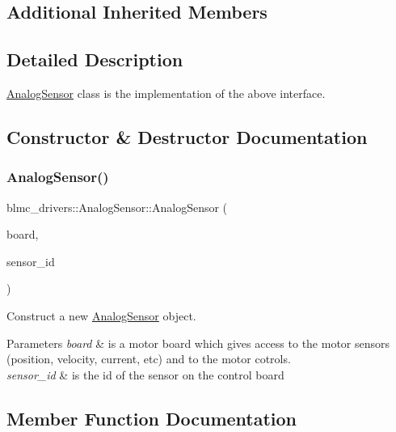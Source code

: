 \subsection*{Additional Inherited Members}


\subsection{Detailed Description}
\hyperlink{classblmc__drivers_1_1AnalogSensor}{Analog\+Sensor} class is the implementation of the above interface. 

\subsection{Constructor \& Destructor Documentation}
\mbox{\label{classblmc__drivers_1_1AnalogSensor_a3107ba6bba78d46e126ffc74c88f5a69}} 
\subsubsection{\texorpdfstring{Analog\+Sensor()}{AnalogSensor()}}
{\footnotesize\ttfamily blmc\+\_\+drivers\+::\+Analog\+Sensor\+::\+Analog\+Sensor (\begin{DoxyParamCaption}\item[{std\+::shared\+\_\+ptr$<$ \hyperlink{classblmc__drivers_1_1MotorBoardInterface}{Motor\+Board\+Interface} $>$}]{board,  }\item[{bool}]{sensor\+\_\+id }\end{DoxyParamCaption})}



Construct a new \hyperlink{classblmc__drivers_1_1AnalogSensor}{Analog\+Sensor} object. 


\begin{DoxyParams}{Parameters}
{\em board} & is a motor board which gives access to the motor sensors (position, velocity, current, etc) and to the motor cotrols. \\
\hline
{\em sensor\+\_\+id} & is the id of the sensor on the control board \\
\hline
\end{DoxyParams}


\subsection{Member Function Documentation}
\mbox{\label{classblmc__drivers_1_1AnalogSensor_af90fc9f142c7855b50f8d295b50d18e6}} 
